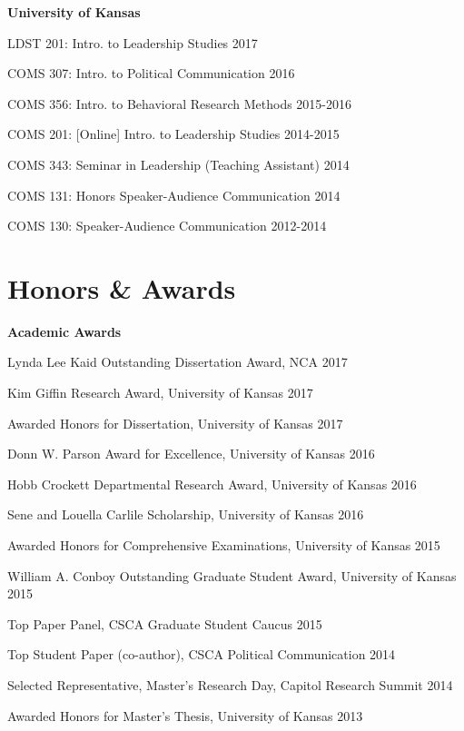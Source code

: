 \documentclass[11pt,letterpaper]{article}
\begin{document}
\textbf{University of Kansas}
\begin{innerlist}
  \item LDST 201: Intro. to Leadership Studies \hfill 2017
  \item COMS 307: Intro. to Political Communication \hfill 2016
  \item COMS 356: Intro. to Behavioral Research Methods \hfill 2015-2016
  \item COMS 201: {[}Online{]} Intro. to Leadership Studies \hfill 2014-2015
  \item COMS 343: Seminar in Leadership (Teaching Assistant) \hfill 2014
  \item COMS 131: Honors Speaker-Audience Communication \hfill 2014
  \item COMS 130: Speaker-Audience Communication \hfill 2012-2014
\end{innerlist}
\vspace{-.1in}

\section{Honors \& \hspace{5mm} Awards}
\textbf{Academic Awards}
\begin{innerlist}
  \item Lynda Lee Kaid Outstanding Dissertation Award, NCA \hfill 2017
  \item Kim Giffin Research Award, University of Kansas \hfill 2017
  \item Awarded Honors for Dissertation, University of Kansas \hfill 2017
  \item Donn W. Parson Award for Excellence, University of Kansas \hfill 2016
  \item Hobb Crockett Departmental Research Award, University of Kansas \hfill 2016
  \item Sene and Louella Carlile Scholarship, University of Kansas \hfill 2016
  \item Awarded Honors for Comprehensive Examinations, University of Kansas \hfill 2015
  \item William A. Conboy Outstanding Graduate Student Award, University of Kansas \hfill 2015
  \item Top Paper Panel, CSCA Graduate Student Caucus \hfill 2015
  \item Top Student Paper (co-author), CSCA Political Communication \hfill 2014
  \item Selected Representative, Master's Research Day, Capitol Research Summit \hfill 2014
  \item Awarded Honors for Master's Thesis, University of Kansas \hfill 2013
  \item[]
\end{innerlist}
\vspace{-.075in}
\end{document}
